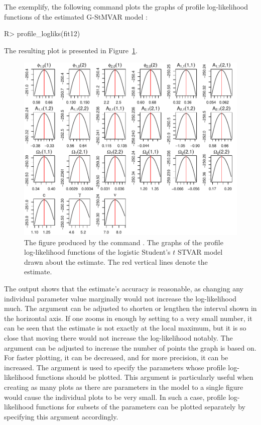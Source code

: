 \documentclass[nojss]{jss}
\begin{document}
The exemplify, the following command plots the graphs of profile log-likelihood functions of the estimated G-StMVAR model :
%
\begin{CodeChunk}
\begin{CodeInput}
R> profile_logliks(fit12)
\end{CodeInput}
\end{CodeChunk}
%
The resulting plot is presented in Figure~\ref{fig:proflogliks}.

\begin{figure}[t]
  \centering
  \includegraphics{figures/profilelogliks.pdf}
  \caption{The figure produced by the command . The graphs of the profile log-likelihood functions of the logistic Student's $t$ STVAR model drawn about the estimate. The red vertical lines denote the estimate.}
\label{fig:proflogliks}
\end{figure}

The output shows that the estimate's accuracy is reasonable, as changing any individual parameter value marginally would not increase the log-likelihood much. The argument  can be adjusted to shorten or lengthen the interval shown in the horizontal axis. If one zooms in enough by setting  to a very small number, it can be seen that the estimate is not exactly at the local maximum, but it is so close that moving there would not increase the log-likelihood notably. The argument  can be adjusted to increase the number of points the graph is based on. For faster plotting, it can be decreased, and for more precision, it can be increased. The argument  is used to specify the parameters whose profile log-likelihood functions should be plotted. This argument is particularly useful when creating as many plots as there are parameters in the model to a single figure would cause the individual plots to be very small. In such a case, profile log-likelihood functions for subsets of the parameters can be plotted separately by specifying this argument accordingly.
\end{document}
